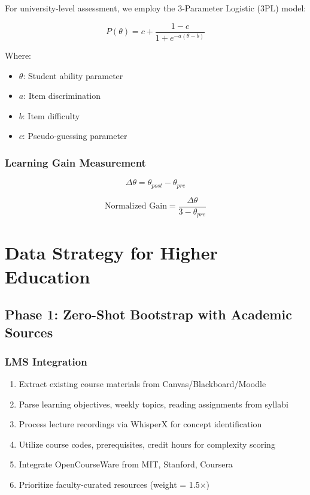 \documentclass[11pt,a4paper]{report}
\begin{document}
For university-level assessment, we employ the 3-Parameter Logistic (3PL) model:

\begin{equation}
P(\theta) = c + \frac{1 - c}{1 + e^{-a(\theta - b)}}
\end{equation}

Where:
\begin{itemize}
    \item $\theta$: Student ability parameter
    \item $a$: Item discrimination
    \item $b$: Item difficulty
    \item $c$: Pseudo-guessing parameter
\end{itemize}

\subsection{Learning Gain Measurement}

\begin{equation}
\Delta\theta = \theta_{post} - \theta_{pre}
\end{equation}

\begin{equation}
\text{Normalized Gain} = \frac{\Delta\theta}{3 - \theta_{pre}}
\end{equation}

\chapter{Data Strategy for Higher Education}

\section{Phase 1: Zero-Shot Bootstrap with Academic Sources}

\subsection{LMS Integration}
\begin{enumerate}
    \item Extract existing course materials from Canvas/Blackboard/Moodle
    \item Parse learning objectives, weekly topics, reading assignments from syllabi
    \item Process lecture recordings via WhisperX for concept identification
    \item Utilize course codes, prerequisites, credit hours for complexity scoring
    \item Integrate OpenCourseWare from MIT, Stanford, Coursera
    \item Prioritize faculty-curated resources (weight = 1.5×)
\end{enumerate}
\end{document}
